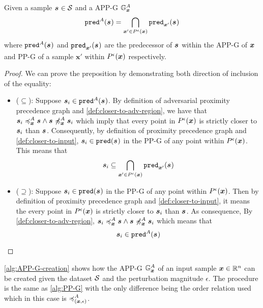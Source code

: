 \begin{proposition}
\label{prop:adv-predecessors-prop}
Given a sample $\sample[] \in \set$ and a \acs{APP-G} $\APPG$
\[
  \boldsymbol{\mathtt{pred}}^A(\sample[]) = \bigcap_{\x[]' \in \pert}  \boldsymbol{\mathtt{pred}}_{\x[]'}(\sample[])
\]
where $\boldsymbol{\mathtt{pred}}^A(\sample[])$ and $\boldsymbol{\mathtt{pred}}_{\x[]'}(\sample[])$ are the predecessor of $\sample[]$ within the \acs{APP-G} of $\x[]$ and \acs{PP-G} of a sample $\boldsymbol{x}'$ within $\pert$ respectively.
\end{proposition}
\begin{proof}
We can prove the preposition by demonstrating both direction of inclusion of the equality:
\begin{itemize}
  \item ($\bm{\subseteq}$): Suppose $\sample \in \boldsymbol{\mathtt{pred}}^A(\sample[])$. By definition of adversarial proximity precedence graph and \autoref{def:closer-to-adv-region}, we have that $\apre{\sample}{\sample[]} \wedge \napre{\sample[]}{\sample}$ which imply that every point in $\pert$ is strictly closer to $\sample$ than $\sample[]$. Consequently, by definition of proximity precedence graph and \autoref{def:closer-to-input}, $\sample \in \pred{\sample[]}$ in the \acs{PP-G} of any point within $\pert$. This means that
  \[
    \sample \subseteq \bigcap_{\x[]' \in \pert}  \boldsymbol{\mathtt{pred}}_{\x[]'}(\sample[])
  \]
  \item ($\bm{\supseteq}$): Suppose $\sample \in \pred{\sample[]}$ in the \acs{PP-G} of any point within $\pert$. Then by definition of proximity precedence graph and \autoref{def:closer-to-input}, it means the every point in $\pert$ is strictly closer to $\sample$ than $\sample[]$. As consequence, By  \autoref{def:closer-to-adv-region}, $\apre{\sample}{\sample[]} \wedge \napre{\sample[]}{\sample}$ which means that
  \[
    \sample \in \boldsymbol{\mathtt{pred}}^A(\sample[])
  \]
\end{itemize}
\end{proof}

\autoref{alg:APP-G-creation} shows how the \acs{APP-G} $\APPG$ of an input sample $\vinput \in \R$ can be created given the dataset $\set$ and the perturbation magnitude $\epsilon$. The procedure is the same as \autoref{alg:PP-G} with the only difference being the order relation used which in this case is $ \preccurlyeq^A_{(\vinput, \epsilon)}$.

